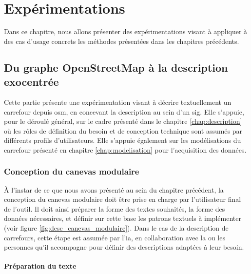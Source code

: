 \chapter{Expérimentations}
\label{chap:implementation}

Dans ce chapitre, nous allons présenter des expérimentations visant à appliquer à des cas d'usage concrets les méthodes présentées dans les chapitres précédents.

\section{Du graphe OpenStreetMap à la description exocentrée}

\label{sec:implementation_segmentation}

Cette partie présente une expérimentation visant à décrire textuellement un carrefour depuis \gls{osm}, en concevant la description au sein d'un \gls{sig}. Elle s'appuie, pour le déroulé général, sur le cadre présenté dans le chapitre \ref{chap:description} où les rôles de définition du besoin et de conception technique sont assumés par différents profils d'utilisateurs. Elle s'appuie également sur les modélisations du carrefour présenté en chapitre \ref{chap:modelisation} pour l'acquisition des données.

\subsection{Conception du canevas modulaire}

À l'instar de ce que nous avons présenté au sein du chapitre précédent, la conception du canevas modulaire doit être prise en charge par l'utilisateur final de l'outil. Il doit ainsi préparer la forme des textes souhaités, la forme des données nécessaires, et définir sur cette base les patrons textuels à implémenter (voir figure \ref{fig:desc_canevas_modulaire}). Dans le cas de la description de carrefours, cette étape est assumée par l'\gls{ia}, en collaboration avec la ou les personnes qu'il accompagne pour définir des descriptions adaptées à leur besoin.

\subsubsection{Préparation du texte}

